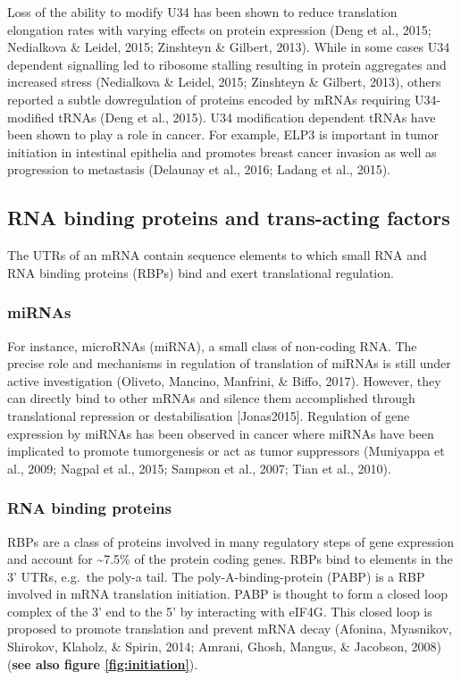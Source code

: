 \documentclass[12pt,openany]{book}
\begin{document}
Loss of the ability to modify U34 has been shown to reduce translation
elongation rates with varying effects on protein expression (Deng et
al., 2015; Nedialkova \& Leidel, 2015; Zinshteyn \& Gilbert, 2013).
While in some cases U34 dependent signalling led to ribosome stalling
resulting in protein aggregates and increased stress (Nedialkova \&
Leidel, 2015; Zinshteyn \& Gilbert, 2013), others reported a subtle
dowregulation of proteins encoded by mRNAs requiring U34-modified tRNAs
(Deng et al., 2015). U34 modification dependent tRNAs have been shown to
play a role in cancer. For example, ELP3 is important in tumor
initiation in intestinal epithelia and promotes breast cancer invasion
as well as progression to metastasis (Delaunay et al., 2016; Ladang et
al., 2015).

\subsection{RNA binding proteins and trans-acting factors}

The UTRs of an mRNA contain sequence elements to which small RNA and RNA
binding proteins (RBPs) bind and exert translational regulation.
\subsubsection{miRNAs} For instance, microRNAs (miRNA), a small class of
non-coding RNA. The precise role and mechanisms in regulation of
translation of miRNAs is still under active investigation (Oliveto,
Mancino, Manfrini, \& Biffo, 2017). However, they can directly bind to
other mRNAs and silence them accomplished through translational
repression or destabilisation {[}Jonas2015{]}. Regulation of gene
expression by miRNAs has been observed in cancer where miRNAs have been
implicated to promote tumorgenesis or act as tumor suppressors
(Muniyappa et al., 2009; Nagpal et al., 2015; Sampson et al., 2007; Tian
et al., 2010). \subsubsection{RNA binding proteins} RBPs are a class of
proteins involved in many regulatory steps of gene expression and
account for \textasciitilde{}7.5\% of the protein coding genes. RBPs
bind to elements in the 3' UTRs, e.g.~the poly-a tail. The
poly-A-binding-protein (PABP) is a RBP involved in mRNA translation
initiation. PABP is thought to form a closed loop complex of the 3' end
to the 5' by interacting with eIF4G. This closed loop is proposed to
promote translation and prevent mRNA decay (Afonina, Myasnikov,
Shirokov, Klaholz, \& Spirin, 2014; Amrani, Ghosh, Mangus, \& Jacobson,
2008) (\textbf{see also figure \ref{fig:initiation}}).
\end{document}
